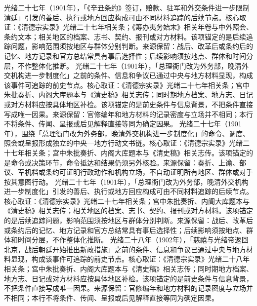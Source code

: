 光绪二十七年（1901年），「《辛丑条约》签订，赔款、驻军和外交条件进一步限制清廷」引发的善后、执行或地方回应构成可由不同材料追踪的后续节点。核心取证：《清德宗实录》光绪二十七年相关条；《筹办夷务始末》相关年卷与中外照会、条约文本；相关地区的档案、志书、契约、报刊或对方材料。该项锚定的是后续追踪问题，影响范围须按地区与群体分别判断。来源保留：战后、改革后或条约后的记忆、地方记录和官方总结常具有事后选择性；后续影响须按地点、群体和时间分层，不作整体化推断。
光绪二十七年（1901年），「总理衙门改为外务部，晚清外交机构进一步制度化」之前的条件、信息和争议已通过中央与地方材料显现，构成该事件可追踪的前史节点。核心取证：《清德宗实录》光绪二十七年相关条；宫中朱批奏折、内阁大库题本与《清史稿》相关志传；同时期地方档案、地方志、日记或对方材料应按具体地区补检。该项锚定的是前史条件与信息背景，不把条件直接写成唯一因果。来源保留：官修编年和地方材料的记录密度与立场并不相同；本行不将条件、传闻、呈报或后见解释直接等同为确定因果。
光绪二十七年（1901年），围绕「总理衙门改为外务部，晚清外交机构进一步制度化」的命令、调度、照会或呈报形成独立的中央—地方行动文书链。核心取证：《清德宗实录》光绪二十七年相关条；宫中朱批奏折、内阁大库题本与《清史稿》相关志传。该项锚定的是命令或决策环节，命令抵达和结果仍须另外核验。来源保留：奏折、上谕、部议、军机档或条约可证明行政动作和机构立场，不自动证明所有地区、群体或对手按其意图行动。
光绪二十七年（1901年），「总理衙门改为外务部，晚清外交机构进一步制度化」引发的善后、执行或地方回应构成可由不同材料追踪的后续节点。核心取证：《清德宗实录》光绪二十七年相关条；宫中朱批奏折、内阁大库题本与《清史稿》相关志传；相关地区的档案、志书、契约、报刊或对方材料。该项锚定的是后续追踪问题，影响范围须按地区与群体分别判断。来源保留：战后、改革后或条约后的记忆、地方记录和官方总结常具有事后选择性；后续影响须按地点、群体和时间分层，不作整体化推断。
光绪二十八年（1902年），「慈禧与光绪帝返回北京，战后朝廷开始推出新政措施」之前的条件、信息和争议已通过中央与地方材料显现，构成该事件可追踪的前史节点。核心取证：《清德宗实录》光绪二十八年相关条；宫中朱批奏折、内阁大库题本与《清史稿》相关志传；同时期地方档案、地方志、日记或对方材料应按具体地区补检。该项锚定的是前史条件与信息背景，不把条件直接写成唯一因果。来源保留：官修编年和地方材料的记录密度与立场并不相同；本行不将条件、传闻、呈报或后见解释直接等同为确定因果。
